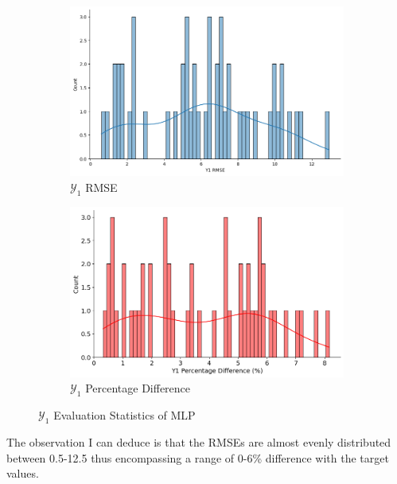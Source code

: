 \documentclass{report} %
\begin{document}
\begin{figure}[H]
    \centering
    \begin{subfigure}{0.5\textwidth}
        \centering
        \includegraphics[width=\textwidth]{./ReportImages/score_MLP_y1.png}
        \caption{$\mathcal{Y}_1$ \ac{RMSE}}
        \label{fig:Y1 RMSE}
    \end{subfigure}\hfill
    \begin{subfigure}{0.5\textwidth}
        \centering
        \includegraphics[width=\textwidth]{./ReportImages/percentage_diff_MLP_y1.png}
        \caption{$\mathcal{Y}_1$ Percentage Difference}
        \label{fig:Y1 Percentage Difference}
    \end{subfigure}
    \caption{$\mathcal{Y}_1$ Evaluation Statistics of \ac{MLP}}
    \label{fig:Y1 Evaluation Statistics MLP}
\end{figure}

The observation I can deduce is that the \ac{RMSE}s are almost evenly distributed between 0.5-12.5 thus encompassing a range of 0-6\% difference with the target values.
\end{document}
